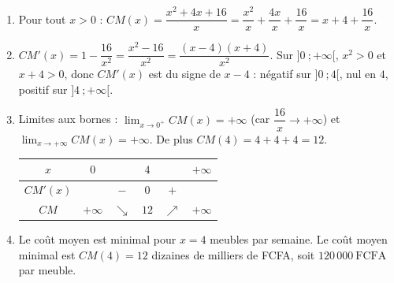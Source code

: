 \documentclass[11pt]{article}
\begin{document}
\begin{corrige}
\begin{enumerate}
\item Pour tout $x > 0$ : $CM(x) = \dfrac{x^2 + 4x + 16}{x} = \dfrac{x^2}{x} + \dfrac{4x}{x} + \dfrac{16}{x} = x + 4 + \dfrac{16}{x}$.
\item $CM'(x) = 1 - \dfrac{16}{x^2} = \dfrac{x^2 - 16}{x^2} = \dfrac{(x-4)(x+4)}{x^2}$. Sur $]0\ ; +\infty[$, $x^2 > 0$ et $x + 4 > 0$, donc $CM'(x)$ est du signe de $x - 4$ : négatif sur $]0\ ; 4[$, nul en $4$, positif sur $]4\ ; +\infty[$.
\item Limites aux bornes : $\displaystyle\lim_{x \to 0^+} CM(x) = +\infty$ (car $\dfrac{16}{x} \to +\infty$) et $\displaystyle\lim_{x \to +\infty} CM(x) = +\infty$. De plus $CM(4) = 4 + 4 + 4 = 12$.
\begin{center}
\begin{tabular}{|c|ccccc|}\hline
$x$ & $0$ & & $4$ & & $+\infty$ \\ \hline
$CM'(x)$ & & $-$ & $0$ & $+$ & \\ \hline
$CM$ & $+\infty$ & $\searrow$ & $12$ & $\nearrow$ & $+\infty$ \\ \hline
\end{tabular}
\end{center}
\item Le coût moyen est minimal pour $x = 4$ meubles par semaine. Le coût moyen minimal est $CM(4) = 12$ dizaines de milliers de FCFA, soit $\boxed{120\,000\ \text{FCFA}}$ par meuble.
\end{enumerate}
\end{corrige}
\end{document}
